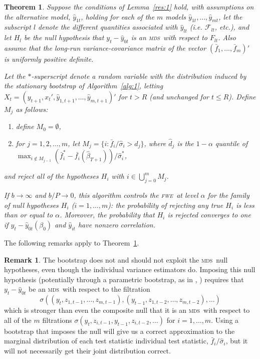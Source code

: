 \documentclass[12pt]{article}
\newcommand\citen[1]{\citeauthor{#1}, \citeyear{#1}}
\newtheorem{thm}{Theorem}
\theoremstyle{definition}
\newtheorem{rem}{Remark}
\newcommand{\mds}{\textsc{mds}}
\newcommand{\fwe}{\textsc{fwe}}
\begin{document}
\begin{thm}\label{res:2}
  Suppose the conditions of Lemma~\ref{res:1} hold, with assumptions
  on the alternative model, $\hat{y}_{1t}$, holding for each of the
  $m$ models $\hat{y}_{1t}, \dots, \hat{y}_{mt}$, let the subscript
  $l$ denote the different quantities associated with $\hat{y}_{lt}$
  (i.e. $\mathcal{F}_{lt}$, etc.), and let $H_l$ be the null
  hypothesis that $y_t - \hat{y}_{0t}$ is an \mds\ with respect to
  $F_{lt}$.  Also assume that the long-run variance-covariance matrix
  of the vector $(\bar{f}_1,\dots,\bar{f}_m)'$ is uniformly positive
  definite.  

  Let the $*$-superscript denote a random variable with the
  distribution induced by the stationary bootstrap of
  Algorithm~\ref{alg:1}, letting $X_t = (y_{t+1}, x_t', \hat{y}_{1,t+1},
  \dots, \hat{y}_{m, t+1})'$ for $t > R$ (and unchanged for $t \leq
  R$).  Define $M_j$ as follows:
  \begin{enumerate}
  \item define $M_0 = \emptyset$,
  \item for $j = 1,2,\dots,m$, let $M_j = \{i : \bar{f}_{i} /
    \hat{\sigma}_i > \hat{d}_j\}$, where $\hat{d}_j$ is the $1-\alpha$
    quantile of $\max_{i \notin M_{j-1}} (\bar{f}_{i}^{*} -
    \bar{f_i}(\hat{\beta}_{T+1})) / \hat{\sigma}_i^{*}$,
  \end{enumerate}
  and reject all of the hypotheses $H_i$ with $i \in \bigcup_{j=0}^m
  M_j$.

  If $b \to \infty$ and $b/P \to 0$, this algorithm controls the
  \fwe\ at level $\alpha$ for the family of null hypotheses $H_i$
  ($i=1,\dots,m$): the probability of rejecting any true $H_i$ is less
  than or equal to $\alpha$.  Moreover, the probability that $H_i$ is
  rejected converges to one if $y_{t} - \hat{y}_{0t}(\beta_0)$ and
  $\hat{y}_{it}$ have nonzero correlation.
\end{thm}

The following remarks apply to Theorem~\ref{res:2}.

\begin{rem}
  The bootstrap does not and should not exploit the \mds\ null
  hypotheses, even though the individual variance estimators do.
  Imposing this null hypothesis (potentially through a parametric
  bootstrap, as in \citen{ClM:11}) requires that $y_t - \hat{y}_{0t}$
  be an \mds\ with respect to the filtration \[\sigma((y_t, z_{1,t-1},
  \dots, z_{m,t-1}), (y_{t-1}, z_{1,t-2}, \dots, z_{m,t-2}), \dots)\]
  which is stronger than even the composite null that it is an \mds\
  with respect to all of the $m$ filtrations $\sigma(y_t, z_{i,t-1},
  y_{t-1}, z_{i,t-2}, \dots)$ for $i = 1,\dots,m$.  Using a bootstrap
  that imposes the null will give us a correct approximation to the
  marginal distribution of each test statistic individual test
  statistic, $\bar{f}_i / \hat{\sigma}_i$, but it will not necessarily
  get their joint distribution correct.
\end{rem}
\end{document}
